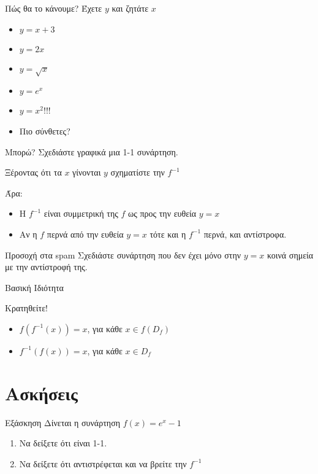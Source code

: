 \documentclass{presentation}
\begin{document}
\begin{frame}{Πώς θα το κάνουμε?}
  Έχετε $y$ και ζητάτε $x$ \pause
  \begin{itemize}
    \item $y=x+3$ \pause
    \item $y=2x$ \pause
    \item $y=\sqrt{x}$ \pause
    \item $y=e^x$ \pause
    \item $y=x^2$!!! \pause
    \item Πιο σύνθετες?
  \end{itemize}
\end{frame}

\begin{frame}{Μπορώ?}
  Σχεδιάστε γραφικά μια 1-1 συνάρτηση. \pause

  Ξέροντας ότι τα $x$ γίνονται $y$ σχηματίστε την $f^{-1}$ \pause

  Άρα:
  \begin{itemize}
    \item Η $f^{-1}$ είναι συμμετρική της $f$ ως προς την ευθεία $y=x$ \pause
    \item Αν η $f$ περνά από την ευθεία $y=x$ τότε και η $f^{-1}$ περνά, και αντίστροφα.
  \end{itemize} \pause
  \begin{alertblock}{Προσοχή στα spam}
    Σχεδιάστε συνάρτηση που δεν έχει μόνο στην $y=x$ κοινά σημεία με την αντίστροφή της.
  \end{alertblock}
\end{frame}

\begin{frame}{Βασική Ιδιότητα}
  \begin{exampleblock}{Κρατηθείτε!}
    \begin{itemize}
      \item $f\left(f^{-1}(x)\right)=x$, για κάθε $x\in f(D_f)$ \pause
      \item $f^{-1}\left(f(x)\right)=x$, για κάθε $x\in D_f$
    \end{itemize}
  \end{exampleblock}
\end{frame}

\section{Ασκήσεις}
\begin{frame}{Εξάσκηση}
  Δίνεται η συνάρτηση $f(x)=e^x-1$
  \begin{enumerate}
    \item Να δείξετε ότι είναι 1-1. \pause
    \item Να δείξετε ότι αντιστρέφεται και να βρείτε την $f^{-1}$
  \end{enumerate}
\end{frame}
\end{document}

